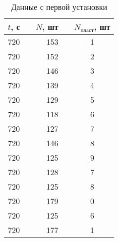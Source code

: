 \begin{table}[h!]
\centering
\caption{Данные с первой установки}
\label{tab:data1}
\begin{tabular}{rcrcc}
\toprule
 $t$, с & \hspace*{10pt} &  $N$, шт & \hspace*{10pt} &  $N_{\text{пласт}}$, шт \\
\midrule
  720 & & 153 & & 1 \\
  720 & & 152 & & 2 \\
  720 & & 146 & & 3 \\
  720 & & 139 & & 4 \\
  720 & & 129 & & 5 \\
  720 & & 118 & & 6 \\
  720 & & 127 & & 7 \\
  720 & & 146 & & 8 \\
  720 & & 125 & & 9 \\
  720 & & 128 & & 7 \\
  720 & & 125 & & 8 \\
  720 & & 179 & & 0 \\
  720 & & 125 & & 6 \\
  720 & & 177 & & 1 \\
\bottomrule
\end{tabular}
\end{table}

